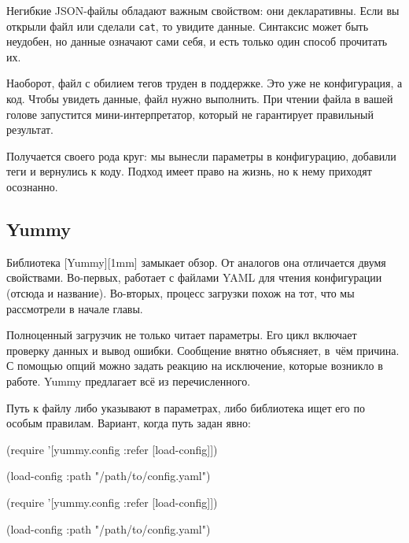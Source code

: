 Негибкие JSON-файлы обладают важным свойством: они декларативны. Если вы открыли
файл или сделали \verb|cat|, то увидите данные. Синтаксис может быть неудобен,
но данные означают сами себя, и есть только один способ прочитать их.

Наоборот, файл с обилием тегов труден в поддержке. Это уже не конфигурация, а
код. Чтобы увидеть данные, файл нужно выполнить. При чтении файла в вашей голове
запустится мини-интерпретатор, который не гарантирует правильный результат.

Получается своего рода круг: мы вынесли параметры в конфигурацию, добавили теги
и вернулись к коду. Подход имеет право на жизнь, но к нему приходят осознанно.

\subsection{Yummy}


Библиотека [Yummy][1mm] замыкает обзор. От
аналогов она отличается двумя свойствами. Во-первых, работает с файлами YAML для
чтения конфигурации (отсюда и название). Во-вторых, процесс загрузки похож на
тот, что мы рассмотрели в начале главы.

Полноценный загрузчик не только читает параметры. Его цикл включает проверку данных
и вывод ошибки. Сообщение внятно объясняет, в~чём причина. С помощью опций можно
задать реакцию на исключение, которые возникло в работе. Yummy предлагает всё из
перечисленного.

Путь к файлу либо указывают в параметрах, либо библиотека ищет его по особым
правилам. Вариант, когда путь задан явно:

\ifx\DEVICETYPE\MOBILE

\begin{english}
  \begin{clojure}
(require
  '[yummy.config :refer [load-config]])

(load-config
  {:path "/path/to/config.yaml"})
  \end{clojure}
\end{english}

\else

\begin{english}
  \begin{clojure}
(require '[yummy.config :refer [load-config]])

(load-config {:path "/path/to/config.yaml"})
  \end{clojure}
\end{english}

